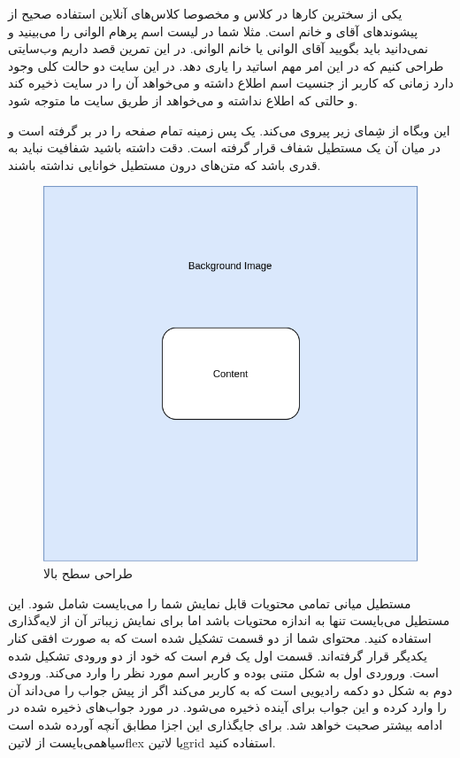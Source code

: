 \documentclass[../main.tex]{subfiles}
\begin{document}

یکی از سخترین کارها در کلاس و مخصوصا کلاس‌های آنلاین استفاده صحیح از پیشوندهای آقای و خانم است.
مثلا شما در لیست اسم پرهام الوانی را می‌بینید و نمی‌دانید باید بگویید آقای الوانی یا خانم الوانی.
در این تمرین قصد داریم وب‌سایتی طراحی کنیم که در این امر مهم اساتید را یاری دهد.
در این سایت دو حالت کلی وجود دارد زمانی که کاربر از جنسیت اسم اطلاع داشته و می‌خواهد آن را در سایت ذخیره کند و حالتی که اطلاع نداشته و می‌خواهد از طریق سایت ما متوجه شود.

این وبگاه از شِمای زیر پیروی می‌کند. یک پس زمینه تمام صفحه را در بر گرفته است و در میان آن یک مستطیل شفاف قرار گرفته است.
دقت داشته باشید شفافیت نباید به قدری باشد که متن‌های درون مستطیل خوانایی نداشته باشند.

\begin{figure}[h]
  \centering
  \includegraphics[scale=0.25]{./genderize-top-level}
  \caption{طراحی سطح بالا}
\end{figure}

مستطیل میانی تمامی محتویات قابل نمایش شما را می‌بایست شامل شود. این مستطیل می‌بایست تنها به اندازه محتویات باشد اما برای نمایش زیباتر آن از لایه‌گذاری استفاده کنید.
محتوای شما از دو قسمت تشکیل شده است که به صورت افقی کنار یکدیگر قرار گرفته‌اند. قسمت اول یک فرم است که خود از دو ورودی تشکیل شده است. وروردی اول به شکل متنی بوده و کاربر اسم مورد نظر را وارد می‌کند.
ورودی دوم به شکل دو دکمه رادیویی است که به کاربر می‌کند اگر از پیش جواب را می‌داند آن را وارد کرده و این جواب برای آینده ذخیره می‌شود. در مورد جواب‌های ذخیره شده در ادامه بیشتر صحبت خواهد شد.
برای جایگذاری این اجزا مطابق آنچه آورده شده است ‌سیاه{می‌بایست} از ‌لاتین{flex} یا ‌لاتین{grid} استفاده کنید.
\end{document}
